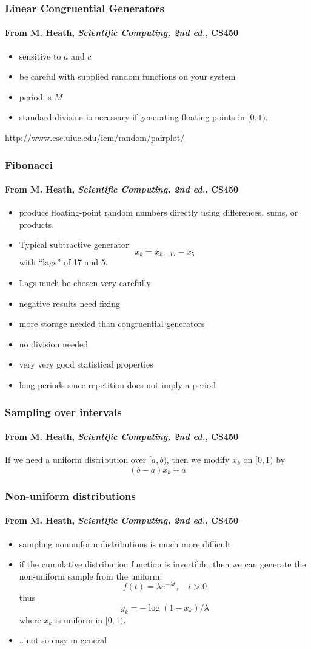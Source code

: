 \documentclass[10pt]{beamer}
\begin{document}
\begin{frame}
\frametitle{Linear Congruential Generators}
\framesubtitle{From M. Heath, \emph{Scientific Computing, 2nd ed.}, CS450}
\begin{itemize}
    \item sensitive to $a$ and $c$
    \item be careful with supplied random functions on your system
    \item period is $M$
    \item standard division is necessary if generating floating points in
$[0,1)$.
\end{itemize}
\bigskip

\url{http://www.cse.uiuc.edu/iem/random/pairplot/}
\end{frame}
\begin{frame}
\frametitle{Fibonacci}
\framesubtitle{From M. Heath, \emph{Scientific Computing, 2nd ed.}, CS450}
\begin{itemize}
    \item produce floating-point random numbers directly using differences,
sums, or products.
    \item Typical subtractive generator:
\[
x_k = x_{k-17} - x_{5}
\]
with ``lags'' of 17 and 5.
    \item Lags much be chosen very carefully
    \item negative results need fixing
    \item more storage needed than congruential generators
    \item no division needed
    \item very very good statistical properties
    \item long periods since repetition does not imply a period
\end{itemize}
\end{frame}
\begin{frame}
\frametitle{Sampling over intervals}
\framesubtitle{From M. Heath, \emph{Scientific Computing, 2nd ed.}, CS450}
    If we need a uniform distribution over $[a,b)$, then we modify $x_k$ on
$[0,1)$ by
\[
(b-a)x_k + a
\]
\end{frame}
\begin{frame}
\frametitle{Non-uniform distributions}
\framesubtitle{From M. Heath, \emph{Scientific Computing, 2nd ed.}, CS450}
\begin{itemize}
    \item sampling nonuniform distributions is much more difficult
    \item if the cumulative distribution function is invertible, then we can
generate the non-uniform sample from the uniform:
\[
f(t) = \lambda e^{-\lambda t},\quad t>0
\]
thus
\[
y_k = -\log(1-x_k)/\lambda
\]
where $x_k$ is uniform in $[0,1)$.
    \item ...not so easy in general
\end{itemize}
\end{frame}
\end{document}
